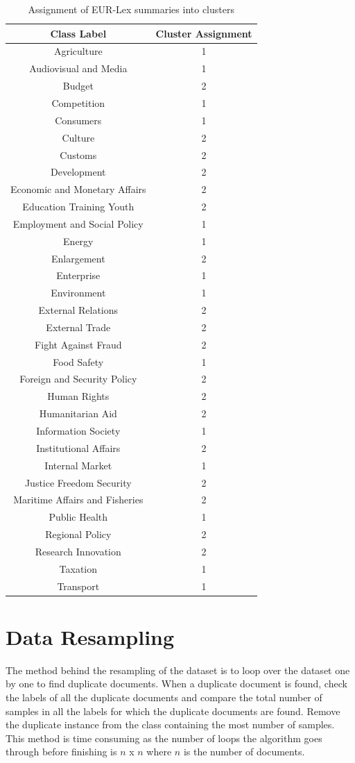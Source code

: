 \begin{table}[!ht]
\centering
\begin{tabular}{cc}
\hline
\textbf{Class Label} & \textbf{Cluster Assignment} \\ \hline
Agriculture & 1 \\ 
Audiovisual and Media & 1 \\ 
Budget & 2 \\ 
Competition & 1 \\ 
Consumers & 1 \\ 
Culture & 2 \\ 
Customs & 2 \\ 
Development & 2 \\ 
Economic and Monetary Affairs & 2 \\ 
Education Training Youth & 2 \\ 
Employment and Social Policy & 1 \\ 
Energy & 1 \\ 
Enlargement & 2 \\ 
Enterprise & 1 \\ 
Environment & 1 \\ 
External Relations & 2 \\ 
External Trade & 2 \\ 
Fight Against Fraud & 2 \\ 
Food Safety & 1 \\ 
Foreign and Security Policy & 2 \\ 
Human Rights & 2 \\ 
Humanitarian Aid & 2 \\ 
Information Society & 1 \\ 
Institutional Affairs & 2 \\ 
Internal Market & 1 \\ 
Justice Freedom Security & 2 \\ 
Maritime Affairs and Fisheries & 2 \\ 
Public Health & 1 \\ 
Regional Policy & 2 \\ 
Research Innovation & 2 \\ 
Taxation & 1 \\ 
Transport & 1 \\ \hline
\end{tabular}
\captionsetup{justification=centering,margin=1cm}
\caption{Assignment of EUR-Lex summaries into clusters}
\label{table:ClusterAssignments32Classes}
\end{table}
\clearpage
\section{Data Resampling} \label{dataResampling}
The method behind the resampling of the dataset is to loop over the dataset one by one to find duplicate documents. When a duplicate document is found, check the labels of all the duplicate documents and compare the total number of samples in all the labels for which the duplicate documents are found. Remove the duplicate instance from the class containing the most number of samples. This method is time consuming as the number of loops the algorithm goes through before finishing is $n$ x $n$ where $n$ is the number of documents.

